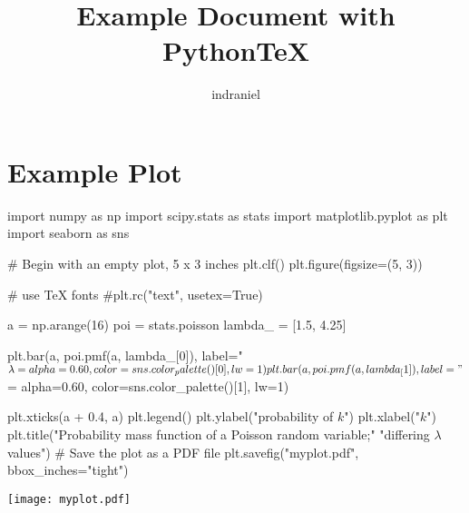 \documentclass{article}
\title{Example Document with Python\TeX}
\author{indraniel}
\begin{document}
\maketitle

\section{Example Plot}

\begin{pycode}
import numpy as np
import scipy.stats as stats
import matplotlib.pyplot as plt
import seaborn as sns

# Begin with an empty plot, 5 x 3 inches
plt.clf()
plt.figure(figsize=(5, 3))

# use TeX fonts
#plt.rc("text", usetex=True)

a = np.arange(16)
poi = stats.poisson
lambda_ = [1.5, 4.25]

plt.bar(a, poi.pmf(a, lambda_[0]),
        label="$\lambda = %
        alpha=0.60,
        color=sns.color_palette()[0],
        lw=1)
plt.bar(a, poi.pmf(a, lambda_[1]),
        label="$\lambda = %
        alpha=0.60,
        color=sns.color_palette()[1],
        lw=1)

plt.xticks(a + 0.4, a)
plt.legend()
plt.ylabel("probability of $k$")
plt.xlabel("$k$")
plt.title("Probability mass function of a Poisson random variable;"
          "differing $\lambda$ values\n")
# Save the plot as a PDF file
plt.savefig("myplot.pdf", bbox_inches="tight")
\end{pycode}

\begin{center}
    \texttt{[image: myplot.pdf]}
\end{center}
\end{document}
